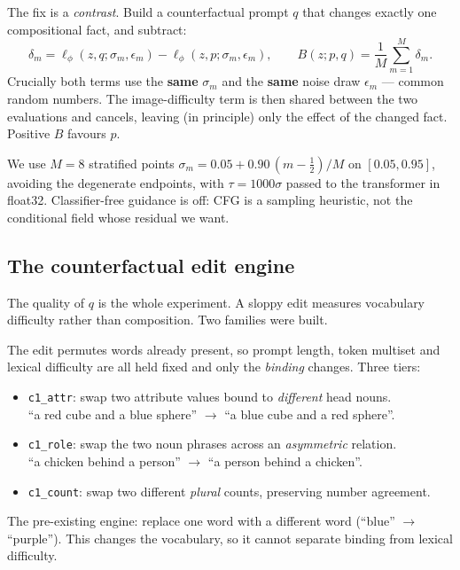 \documentclass[10pt]{article}
\begin{document}
The fix is a \emph{contrast}. Build a counterfactual prompt $q$ that changes exactly one
compositional fact, and subtract:
\begin{equation}
  \delta_m = \ell_\phi(z,q;\sigma_m,\epsilon_m) - \ell_\phi(z,p;\sigma_m,\epsilon_m),
  \qquad
  B(z;p,q) = \frac{1}{M}\sum_{m=1}^{M}\delta_m .
\label{eq:contrast}
\end{equation}
Crucially both terms use the \textbf{same} $\sigma_m$ and the \textbf{same} noise draw
$\epsilon_m$ --- common random numbers. The image-difficulty term is then shared between the two
evaluations and cancels, leaving (in principle) only the effect of the changed fact. Positive $B$
favours $p$.

We use $M=8$ stratified points $\sigma_m = 0.05 + 0.90\,(m-\tfrac12)/M$ on $[0.05,0.95]$, avoiding
the degenerate endpoints, with $\tau = 1000\sigma$ passed to the transformer in float32.
Classifier-free guidance is off: CFG is a sampling heuristic, not the conditional field whose
residual we want.

\subsection{The counterfactual edit engine}

The quality of $q$ is the whole experiment. A sloppy edit measures vocabulary difficulty rather than
composition. Two families were built.

\begin{description}[leftmargin=1.2em,style=nextline]
  \item[C1, same-token-multiset swaps (primary).]
    The edit permutes words already present, so prompt length, token multiset and lexical difficulty
    are all held fixed and only the \emph{binding} changes. Three tiers:
    \begin{itemize}
      \item \texttt{c1\_attr}: swap two attribute values bound to \emph{different} head nouns.\\
        ``a red cube and a blue sphere'' $\rightarrow$ ``a blue cube and a red sphere''.
      \item \texttt{c1\_role}: swap the two noun phrases across an \emph{asymmetric} relation.\\
        ``a chicken behind a person'' $\rightarrow$ ``a person behind a chicken''.
      \item \texttt{c1\_count}: swap two different \emph{plural} counts, preserving number agreement.
    \end{itemize}
  \item[C2, single-token lexical replacement (secondary).]
    The pre-existing engine: replace one word with a different word (``blue'' $\rightarrow$
    ``purple''). This changes the vocabulary, so it cannot separate binding from lexical difficulty.
\end{description}
\end{document}
